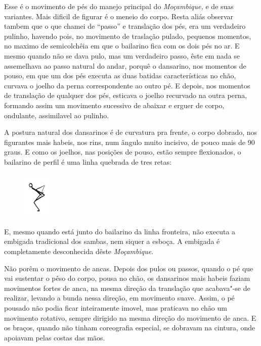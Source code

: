 Esse é o movimento de pés do manejo principal do \emph{Moçambique,} e de
suas variantes. Mais dificil de figurar é o meneio do corpo. Resta aliás
observar tambem que o que chamei de ``passo'' e translação dos pés, era
um verdadeiro pulinho, havendo pois, no movimento de traslação pulado,
pequenos momentos, no maximo de semicolchêia em que o bailarino fica com
os dois pés no ar. E mesmo quando não se dava pulo, mas um verdadeiro
passo, êste em nada se assemelhava ao passo natural do andar, porquê o
dansarino, nos momentos de pouso, em que um dos pés executa as duas
batidas características no chão, curvava o joelho da perna
correspondente ao outro pé. E depois, nos momentos de translação de
qualquer dos pés, esticava o joelho recurvado na outra perna, formando
assim um movimento sucessivo de abaixar e erguer de corpo, ondulante,
assimilavel ao pulinho.

A postura natural dos dansarinos é de curvatura pra frente, o corpo
dobrado, nos figurantes mais habeis, nos rins, num ângulo muito
incisivo, de pouco mais de 90 graus. E como os joelhos, nas posições de
pouso, estão sempre flexionados, o bailarino de perfil é uma linha
quebrada de tres retas:

\begin{figure}[!ht]
\centering
 \includegraphics[width=13mm]{./imgs/img4.jpg}
\end{figure}

E, mesmo quando está junto do bailarino da linha fronteira, não executa
a embigada tradicional dos sambas, nem siquer a esboça. A embigada é
completamente desconhecida dêste \emph{Moçambique}.

Não porêm o movimento de ancas. Depois dos pulos ou passos, quando o pé
que vai sustentar o pêso do corpo, pousa no chão, os dansarinos mais
habeis faziam movimentos fortes de anca, na mesma direção da translação
que acabava"-se de realizar, levando a bunda nessa direção, em movimento
suave. Assim, o pé pousado não podia ficar inteiramente imovel, mas
praticava no chão um movimento rotativo, sempre dirigido na mesma
direção do movimento de anca. E os braços, quando não tinham coreografia
especial, se dobravam na cintura, onde apoiavam pelas costas das mãos.

